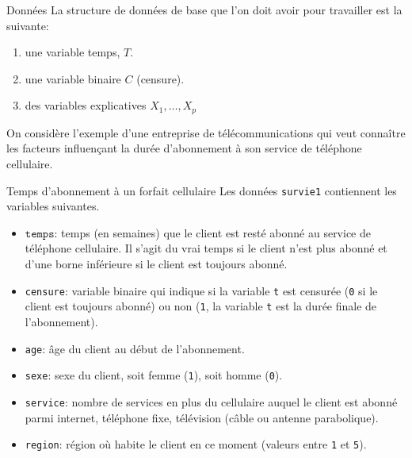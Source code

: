 \documentclass[
  ignorenonframetext,
]{beamer}
\providecommand{\tightlist}{%
  \setlength{\itemsep}{0pt}\setlength{\parskip}{0pt}}\usepackage{longtable,booktabs,array}
\begin{document}
\begin{frame}{Données}
\protect\hypertarget{donnuxe9es}{}
La structure de données de base que l'on doit avoir pour travailler est
la suivante:

\begin{enumerate}
\tightlist
\item
  une variable temps, \(T\).
\item
  une variable binaire \(C\) (censure).
\item
  des variables explicatives \(X_1, \ldots, X_p\)
\end{enumerate}

On considère l'exemple d'une entreprise de télécommunications qui veut
connaître les facteurs influençant la durée d'abonnement à son service
de téléphone cellulaire.
\end{frame}

\begin{frame}[fragile]{Temps d'abonnement à un forfait cellulaire}
\protect\hypertarget{temps-dabonnement-uxe0-un-forfait-cellulaire}{}
Les données \texttt{survie1} contiennent les variables suivantes.

\begin{itemize}
\tightlist
\item
  \(\texttt{temps}\): temps (en semaines) que le client est resté abonné
  au service de téléphone cellulaire. Il s'agit du vrai temps si le
  client n'est plus abonné et d'une borne inférieure si le client est
  toujours abonné.
\item
  \texttt{censure}: variable binaire qui indique si la variable
  \texttt{t} est censurée (\texttt{0} si le client est toujours abonné)
  ou non (\texttt{1}, la variable \texttt{t} est la durée finale de
  l'abonnement).
\item
  \texttt{age}: âge du client au début de l'abonnement.
\item
  \texttt{sexe}: sexe du client, soit femme (\texttt{1}), soit homme
  (\texttt{0}).
\item
  \texttt{service}: nombre de services en plus du cellulaire auquel le
  client est abonné parmi internet, téléphone fixe, télévision (câble ou
  antenne parabolique).
\item
  \texttt{region}: région où habite le client en ce moment (valeurs
  entre \texttt{1} et \texttt{5}).
\end{itemize}
\end{frame}
\end{document}
